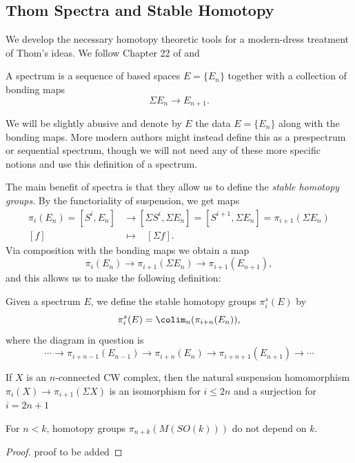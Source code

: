 \subsection{Thom Spectra and Stable Homotopy}
We develop the necessary homotopy theoretic tools for a modern-dress treatment of Thom's ideas. We follow Chapter 22 of \cite{maybook} and \cite{malkiewich}
\begin{definition}[Spectrum]
    A spectrum is a sequence of based spaces $E=\{E_n\}$ together with a collection of bonding maps 
    \[\Sigma E_n\to E_{n+1}.\]
\end{definition}
We will be slightly abusive and denote by $E$ the data $E=\{E_n\}$ along with the bonding maps. More modern authors might instead define this as a prespectrum or sequential spectrum, though we will not need any of these more specific notions and use this definition of a spectrum. 

The main benefit of spectra is that they allow us to define the \textit{stable homotopy groups}. By the functoriality of suspension, we get maps
\begin{align*}
    \pi_i(E_n)=[S^i, E_n]&\to [\Sigma S^i, \Sigma E_n]=[S^{i+1}, \Sigma E_n]=\pi_{i+1}(\Sigma E_{n})\\
    [f]\hspace{10pt}&\mapsto \hspace{10pt}[\Sigma f].
\end{align*}
Via composition with the bonding maps we obtain a map
\[\pi_i(E_n)\to \pi_{i+1}(\Sigma E_{n})\to \pi_{i+1}(E_{n+1}),\]
and this allows us to make the following definition:
\begin{definition}
    Given a spectrum $E$, we define the stable homotopy groups $\pi_i^s(E)$ by 
    \[\pi_i^s(E)=\colim_n(\pi_{i+n}(E_n)),\]
    where the diagram in question is 
    \[\cdots\to\pi_{i+n-1}(E_{n-1})\to \pi_{i+n}(E_{n})\to \pi_{i+n+1}(E_{n+1})\to \cdots\]
\end{definition}
\begin{theorem}
\label{theorem1/6}
    If $X$ is an $n$-connected CW complex, then the natural suspension homomorphism $\pi_i(X)\to \pi_{i+1}(\Sigma X)$ is an isomorphism for $i\leq 2n$ and a surjection for $i=2n+1$
\end{theorem}

\begin{theorem}
    For $n<k$, homotopy groups $\pi_{n+k}(M(SO(k)))$ do not depend on $k$. 
\end{theorem}
\begin{proof}
    proof to be added
\end{proof}

